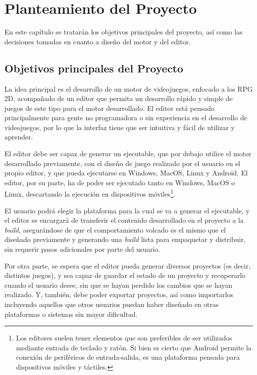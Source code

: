 \chapter{Planteamiento del Proyecto}
\label{cap:planteamiento}

\begin{resumen}
En este capítulo se tratarán los objetivos principales del proyecto, así como las decisiones tomadas en cuanto a diseño del motor y del editor.
\end{resumen}

\section{Objetivos principales del Proyecto}
La idea principal es el desarrollo de un motor de videojuegos, enfocado a los RPG 2D, acompañado de un editor que permita un desarrollo rápido y simple de juegos de este tipo para el motor desarrollado. El editor está pensado principalmente para gente no programadora o sin experiencia en el desarrollo de videojuegos, por lo que la interfaz tiene que ser intuitiva y fácil de utilizar y aprender.

\smallskip

El editor debe ser capaz de generar un ejecutable, que por debajo utilice el motor desarrollado previamente, con el diseño de juego realizado por el usuario en el propio editor, y que pueda ejecutarse en Windows, MacOS, Linux y Android. El editor, por su parte, ha de poder ser ejecutado tanto en Windows, MacOS o Linux, descartando la ejecución en dispositivos móviles\footnote{Los editores suelen tener elementos que son preferibles de ser utilizados mediante entrada de teclado y ratón. Si bien es cierto que Android permite la conexión de periféricos de entrada-salida, es una plataforma pensada para dispositivos móviles y táctiles.}.

\smallskip

El usuario podrá elegir la plataforma para la cual se va a generar el ejecutable, y el editor se encargará de transferir el contenido desarrollado en el proyecto a la \textit{build}, asegurándose de que el comportamiento volcado es el mismo que el diseñado previamente y generando una \textit{build} lista para empaquetar y distribuir, sin requerir pasos adicionales por parte del usuario.

\medskip

Por otra parte, se espera que el editor pueda generar diversos proyectos (es decir, distintos juegos), y sea capaz de guardar el estado de un proyecto y recuperarlo cuando el usuario desee, sin que se hayan perdido los cambios que se hayan realizado. Y, también, debe poder exportar proyectos, así como importarlos incluyendo aquellos que otros usuarios puedan haber diseñado en otras plataformas o sistemas sin mayor dificultad.

